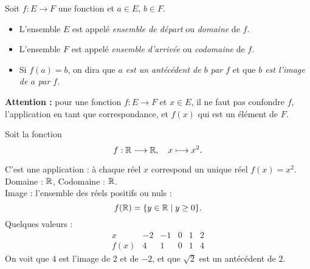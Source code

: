 \begin{remark}
    Soit $f : E \longrightarrow F$ une fonction et $a \in E$, $b \in F$. 
    \begin{itemize}
        \item L'ensemble $E$ est appelé \emph{ensemble de départ} ou \emph{domaine} de $f$.
        \item L'ensemble $F$ est appelé \emph{ensemble d'arrivée} ou \emph{codomaine} de $f$.
        \item Si $f(a) = b$, on dira que \emph{$a$ est un antécédent de $b$ par $f$} et que \emph{$b$ est l'image de $a$ par $f$}.
    \end{itemize}
\end{remark}

\textbf{Attention :} pour une fonction $f : E \longrightarrow F$ et $x \in E$, il ne faut pas confondre $f$, l’application en tant que correspondance, et $f(x)$ qui est un élément de $F$.


\begin{example}
    Soit la fonction 
    \[
        f : \mathbb{R} \longrightarrow \mathbb{R}, \quad x \longmapsto x^2.
    \]

    \begin{minipage}{0.45\textwidth}
        \centering
    \end{minipage}
    \hfill
    \begin{minipage}{0.45\textwidth}
        C'est une application : à chaque réel $x$ correspond un unique réel $f(x) = x^2$. \\
        Domaine : $\mathbb{R}$, Codomaine : $\mathbb{R}$. \\
        Image : l'ensemble des réels positifs ou nuls :
        \[
            f(\mathbb{R}) = \{ y \in \mathbb{R} \mid y \geq 0 \}.
        \]
        Quelques valeurs :
        \[
        \begin{array}{c|c|c|c|c|c}
        x & -2 & -1 & 0 & 1 & 2 \\ \hline
        f(x) & 4 & 1 & 0 & 1 & 4
        \end{array}
        \]
        On voit que $4$ est l'image de $2$ et de $-2$, et que $\sqrt{2}$ est un antécédent de $2$.
    \end{minipage}
\end{example}

